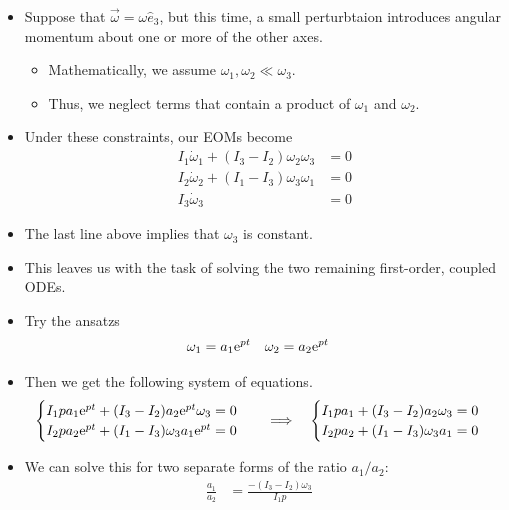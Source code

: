 \documentclass[../notes.tex]{subfiles}
\begin{document}
\begin{itemize}
\begin{itemize}
        \item Suppose that $\vec{\omega}=\omega\hat{e}_3$, but this time, a small perturbtaion introduces angular momentum about one or more of the other axes.
        \begin{itemize}
            \item Mathematically, we assume $\omega_1,\omega_2\ll\omega_3$.
            \item Thus, we neglect terms that contain a product of $\omega_1$ and $\omega_2$.
        \end{itemize}
        \item Under these constraints, our EOMs become
        \begin{align*}
            I_1\dot{\omega}_1+(I_3-I_2)\omega_2\omega_3 &= 0\\
            I_2\dot{\omega}_2+(I_1-I_3)\omega_3\omega_1 &= 0\\
            I_3\dot{\omega}_3 &= 0
        \end{align*}
        \item The last line above implies that $\omega_3$ is constant.
        \item This leaves us with the task of solving the two remaining first-order, coupled ODEs.
        \item Try the ansatzs
        \begin{align*}
            \omega_1 &= a_1\e[pt]&
            \omega_2 &= a_2\e[pt]
        \end{align*}
        \item Then we get the following system of equations.
        \begin{equation*}
            \begin{cases}
                I_1pa_1\e[pt]+(I_3-I_2)a_2\e[pt]\omega_3 = 0\\
                I_2pa_2\e[pt]+(I_1-I_3)\omega_3a_1\e[pt] = 0
            \end{cases}
            \quad\Longrightarrow\quad
            \begin{cases}
                I_1pa_1+(I_3-I_2)a_2\omega_3 = 0\\
                I_2pa_2+(I_1-I_3)\omega_3a_1 = 0
            \end{cases}
        \end{equation*}
        \item We can solve this for two separate forms of the ratio $a_1/a_2$:
        \begin{align*}
            \frac{a_1}{a_2} &= \frac{-(I_3-I_2)\omega_3}{I_1p}&

\end{align*}
\end{itemize}
\end{itemize}
\end{document}
